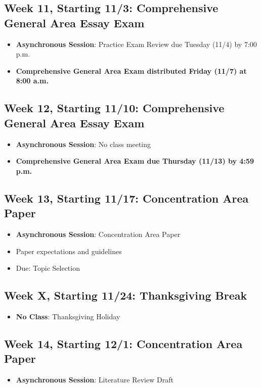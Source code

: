 \documentclass[12pt, letterpaper]{article}
\begin{document}
\subsection*{Week 11, Starting 11/3: Comprehensive General Area Essay Exam}
\begin{itemize}
    \item \textbf{Asynchronous Session}: Practice Exam Review due Tuesday (11/4) by 7:00 p.m.
    \item \textbf{Comprehensive General Area Exam distributed Friday (11/7) at 8:00 a.m.}
\end{itemize}

\subsection*{Week 12, Starting 11/10: Comprehensive General Area Essay Exam}
\begin{itemize}
    \item \textbf{Asynchronous Session}: No class meeting
    \item \textbf{Comprehensive General Area Exam due Thursday (11/13) by 4:59 p.m.}
\end{itemize}

\subsection*{Week 13, Starting 11/17: Concentration Area Paper}
\begin{itemize}
    \item \textbf{Asynchronous Session}: Concentration Area Paper
    \item Paper expectations and guidelines 
    \item Due: Topic Selection
\end{itemize}

\subsection*{Week X, Starting 11/24: Thanksgiving Break}
\begin{itemize}
    \item \textbf{No Class}: Thanksgiving Holiday
\end{itemize}

\subsection*{Week 14, Starting 12/1: Concentration Area Paper}
\begin{itemize}
    \item \textbf{Asynchronous Session}: Literature Review Draft
\end{itemize}
\end{document}
